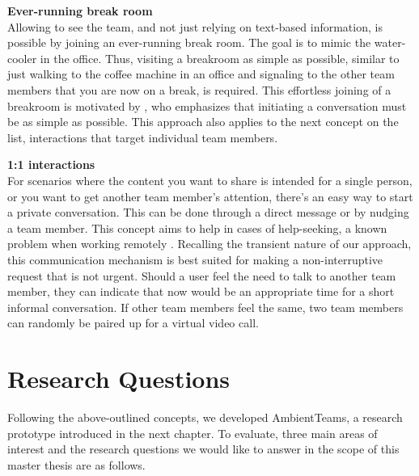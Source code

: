 \medskip\noindent\textbf{Ever-running break room} \\
Allowing to see the team, and not just relying on text-based information, is possible by joining an ever-running break room. The goal is to mimic the water-cooler in the office. Thus, visiting a breakroom as simple as possible, similar to just walking to the coffee machine in an office and signaling to the other team members that you are now on a break, is required. This effortless joining of a breakroom is motivated by \textcite{chang2007out}, who emphasizes that initiating a conversation must be as simple as possible. This approach also applies to the next concept on the list, interactions that target individual team members.

\medskip\noindent\textbf{1:1 interactions} \\
For scenarios where the content you want to share is intended for a single person, or you want to get another team member's attention, there's an easy way to start a private conversation. This can be done through a direct message or by nudging a team member. This concept aims to help in cases of help-seeking, a known problem when working remotely \autocite{herbsleb2003empirical}. Recalling the transient nature of our approach, this communication mechanism is best suited for making a non-interruptive request that is not urgent. Should a user feel the need to talk to another team member, they can indicate that now would be an appropriate time for a short informal conversation. If other team members feel the same, two team members can randomly be paired up for a virtual video call.

\section{Research Questions}
Following the above-outlined concepts, we developed AmbientTeams, a research prototype introduced in the next chapter. To evaluate, three main areas of interest and the research questions we would like to answer in the scope of this master thesis are as follows.


